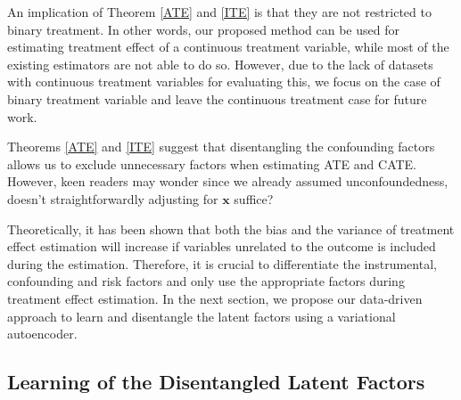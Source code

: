 \documentclass[letterpaper]{article} %
\newtheorem{theorem}{Theorem}
\begin{document}
An implication of Theorem \ref{ATE} and \ref{ITE} is that they are not restricted to binary treatment. In other words, our proposed method can be used for estimating treatment effect of a continuous treatment variable, while most of the existing estimators are not able to do so. However, due to the lack of datasets with continuous treatment variables for evaluating this, we focus on the case of binary treatment variable and leave the continuous treatment case for future work.

Theorems \ref{ATE} and \ref{ITE} suggest that disentangling the confounding factors allows us to exclude unnecessary factors when estimating ATE and CATE. However, keen readers may wonder since we already assumed unconfoundedness, doesn't straightforwardly adjusting for $\mathbf{x}$ suffice? 

Theoretically, it has been shown that both the bias \cite{Abadie2006} and the variance \cite{Hahn1998} of treatment effect estimation will increase if variables unrelated to the outcome is included during the estimation. Therefore, it is crucial to differentiate the instrumental, confounding and risk factors and only use the appropriate factors during treatment effect estimation. 
In the next section, we propose our data-driven approach to learn and disentangle the latent factors using a variational autoencoder.


\subsection*{Learning of the Disentangled Latent Factors}
\end{document}
